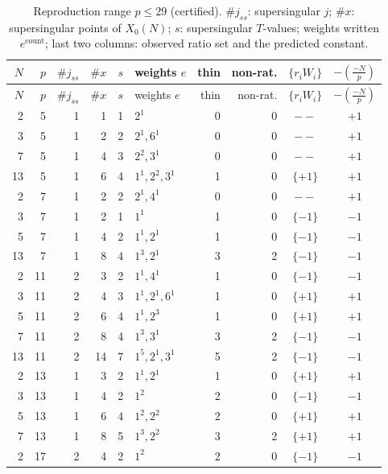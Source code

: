 \documentclass[11pt,a4paper]{article}
\numberwithin{equation}{section}
\theoremstyle{definition}
\theoremstyle{remark}
\begin{document}
{\small
\begin{longtable}{rrrrrlrrcc}
\caption{Reproduction range $p\le29$ (certified). $\#j_{ss}$: supersingular $j$; $\#x$: supersingular points of $X_0(N)$; $s$: supersingular $T$-values; weights written $e^{\text{count}}$; last two columns: observed ratio set and the predicted constant.}\label{tab:p29}\\
\toprule
$N$ & $p$ & $\#j_{ss}$ & $\#x$ & $s$ & weights $e$ & thin & non-rat. & $\{r_iW_i\}$ & $-\left(\frac{-N}{p}\right)$\\
\midrule
\endfirsthead
\toprule
$N$ & $p$ & $\#j_{ss}$ & $\#x$ & $s$ & weights $e$ & thin & non-rat. & $\{r_iW_i\}$ & $-\left(\frac{-N}{p}\right)$\\
\midrule
\endhead
2 & 5 & 1 & 1 & 1 & $2^{1}$ & 0 & 0 & $--$ & $+1$\\
3 & 5 & 1 & 2 & 2 & $2^{1}, 6^{1}$ & 0 & 0 & $--$ & $+1$\\
7 & 5 & 1 & 4 & 3 & $2^{2}, 3^{1}$ & 0 & 0 & $--$ & $+1$\\
13 & 5 & 1 & 6 & 4 & $1^{1}, 2^{2}, 3^{1}$ & 1 & 0 & $\{+1\}$ & $+1$\\
2 & 7 & 1 & 2 & 2 & $2^{1}, 4^{1}$ & 0 & 0 & $--$ & $+1$\\
3 & 7 & 1 & 2 & 1 & $1^{1}$ & 1 & 0 & $\{-1\}$ & $-1$\\
5 & 7 & 1 & 4 & 2 & $1^{1}, 2^{1}$ & 1 & 0 & $\{-1\}$ & $-1$\\
13 & 7 & 1 & 8 & 4 & $1^{3}, 2^{1}$ & 3 & 2 & $\{-1\}$ & $-1$\\
2 & 11 & 2 & 3 & 2 & $1^{1}, 4^{1}$ & 1 & 0 & $\{-1\}$ & $-1$\\
3 & 11 & 2 & 4 & 3 & $1^{1}, 2^{1}, 6^{1}$ & 1 & 0 & $\{+1\}$ & $+1$\\
5 & 11 & 2 & 6 & 4 & $1^{1}, 2^{3}$ & 1 & 0 & $\{+1\}$ & $+1$\\
7 & 11 & 2 & 8 & 4 & $1^{3}, 3^{1}$ & 3 & 2 & $\{-1\}$ & $-1$\\
13 & 11 & 2 & 14 & 7 & $1^{5}, 2^{1}, 3^{1}$ & 5 & 2 & $\{-1\}$ & $-1$\\
2 & 13 & 1 & 3 & 2 & $1^{1}, 2^{1}$ & 1 & 0 & $\{+1\}$ & $+1$\\
3 & 13 & 1 & 4 & 2 & $1^{2}$ & 2 & 0 & $\{-1\}$ & $-1$\\
5 & 13 & 1 & 6 & 4 & $1^{2}, 2^{2}$ & 2 & 0 & $\{+1\}$ & $+1$\\
7 & 13 & 1 & 8 & 5 & $1^{3}, 2^{2}$ & 3 & 2 & $\{+1\}$ & $+1$\\
2 & 17 & 2 & 4 & 2 & $1^{2}$ & 2 & 0 & $\{-1\}$ & $-1$\\

\end{longtable}}
\end{document}
